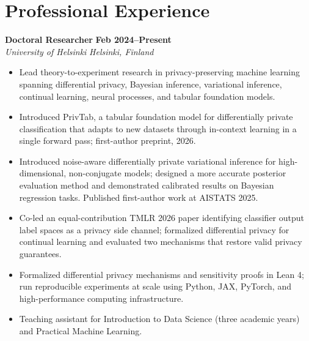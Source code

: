 \documentclass[10pt,a4paper]{article}
\newcommand{\role}[4]{%
  \textbf{#1} \hfill \textbf{#2}\\[-1pt]
  \textit{#3} \hfill \textit{#4}\par\vspace{-2pt}
}
\begin{document}
\section{Professional Experience}
\role{Doctoral Researcher}{Feb 2024--Present}{University of Helsinki}{Helsinki, Finland}
\begin{itemize}
  \item Lead theory-to-experiment research in privacy-preserving machine learning spanning differential privacy, Bayesian inference, variational inference, continual learning, neural processes, and tabular foundation models.
  \item Introduced PrivTab, a tabular foundation model for differentially private classification that adapts to new datasets through in-context learning in a single forward pass; first-author preprint, 2026.
  \item Introduced noise-aware differentially private variational inference for high-dimensional, non-conjugate models; designed a more accurate posterior evaluation method and demonstrated calibrated results on Bayesian regression tasks. Published first-author work at AISTATS 2025.
  \item Co-led an equal-contribution TMLR 2026 paper identifying classifier output label spaces as a privacy side channel; formalized differential privacy for continual learning and evaluated two mechanisms that restore valid privacy guarantees.
  \item Formalized differential privacy mechanisms and sensitivity proofs in Lean 4; run reproducible experiments at scale using Python, JAX, PyTorch, and high-performance computing infrastructure.
  \item Teaching assistant for Introduction to Data Science (three academic years) and Practical Machine Learning.
\end{itemize}
\end{document}
